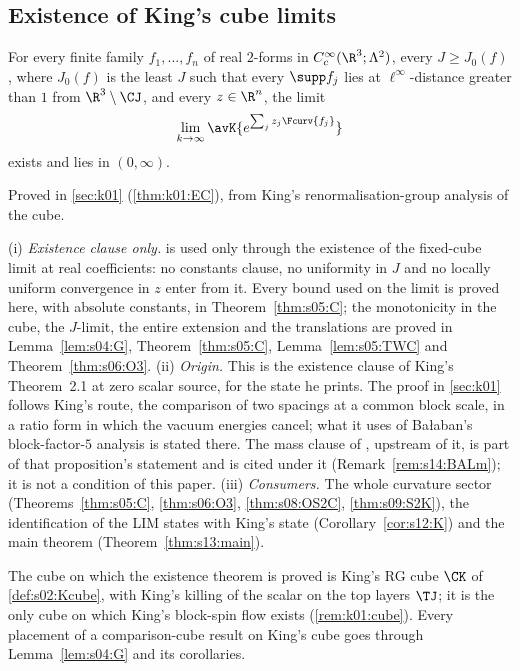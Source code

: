 \subsection{Existence of King's cube limits}

\begin{theorem}\label{hyp:s03:EC}
For every finite family $f_1,\dots,f_n$ of real $2$-forms in $C^\infty_c(\R^3;\Lambda^2)$, every $J\ge J_0(f)$, where $J_0(f)$ is the least $J$ such that every $\supp f_j$ lies at $\ell^\infty$-distance greater than $1$ from $\R^3\setminus\CJ$, and every $z\in\R^n$, the limit
\[
\lim_{k\to\infty}\avK{e^{\sum_j z_j\Fcurv{f_j}}}
\]
exists and lies in $(0,\infty)$.
\end{theorem}
Proved in \cref{sec:k01} (\cref{thm:k01:EC}), from King's renormalisation-group analysis of the cube.

\begin{remark}\label{rem:s03:EC}
(i) \emph{Existence clause only.}  is used only through the existence of the fixed-cube limit at real coefficients: no constants clause, no uniformity in $J$ and no locally uniform convergence in $z$ enter from it. Every bound used on the limit is proved here, with absolute constants, in Theorem~\ref{thm:s05:C}; the monotonicity in the cube, the $J$-limit, the entire extension and the translations are proved in Lemma~\ref{lem:s04:G}, Theorem~\ref{thm:s05:C}, Lemma~\ref{lem:s05:TWC} and Theorem~\ref{thm:s06:O3}.
(ii) \emph{Origin.} This is the existence clause of King's Theorem~2.1 \cite{K2} at zero scalar source, for the state he prints. The proof in \cref{sec:k01} follows King's route, the comparison of two spacings at a common block scale, in a ratio form in which the vacuum energies cancel; what it uses of Ba{\l}aban's block-factor-$5$ analysis \cite{Ba1,Ba2,Ba3,Ba4} is stated there. The mass clause of \cite[Prop.~3.1]{Ba2}, upstream of it, is part of that proposition's statement and is cited under it (Remark~\ref{rem:s14:BALm}); it is not a condition of this paper.
(iii) \emph{Consumers.} The whole curvature sector (Theorems~\ref{thm:s05:C}, \ref{thm:s06:O3}, \ref{thm:s08:OS2C}, \ref{thm:s09:S2K}), the identification of the LIM states with King's state (Corollary~\ref{cor:s12:K}) and the main theorem (Theorem~\ref{thm:s13:main}).
\end{remark}

\begin{remark}\label{rem:s03:cube-identification}
The cube on which the existence theorem is proved is King's RG cube $\CK$ of \cref{def:s02:Kcube}, with King's killing of the scalar on the top layers $\TJ$; it is the only cube on which King's block-spin flow exists (\cref{rem:k01:cube}). Every placement of a comparison-cube result on King's cube goes through Lemma~\ref{lem:s04:G} and its corollaries.
\end{remark}

